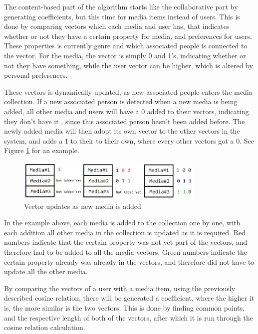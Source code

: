 The content-based part of the algorithm starts like the collaborative part by generating coefficients, but this time for media items instead of users. This is done by comparing vectors which each media and user has, that indicates whether or not they have a certain property for media, and preferences for users. These properties is currently genre and which associated people is connected to the vector. For the media, the vector is simply 0 and 1’s, indicating whether or not they have something, while the user vector can be higher, which is altered by personal preferences.

These vectors is dynamically updated, as new associated people enters the media collection. If a new associated person is detected when a new media is being added, all other media and users will have a 0 added to their vectors, indicating they don’t have it , since this associated person hasn’t been added before. The newly added media will then adopt its own vector to the other vectors in the system, and adds a 1 to their to their own, where every other vectors got a 0. See Figure \ref{VectorUpdate} for an example.

\begin{figure}[htb]
\centering
\includegraphics[width=0.8\textwidth]{Images/VectorUpdate.png}
\caption{Vector updates as new media is added}
\label{VectorUpdate}
\end{figure}

In the example above, each media is added to the collection one by one, with each addition all other media in the collection is updated as it is required. Red numbers indicate that the certain property was not yet part of the vectors, and therefore had to be added to all the media vectors. Green numbers indicate the certain property already was already in the vectors, and therefore did not have to update all the other media.

By comparing the vectors of a user with a media item, using the previously described cosine relation, there will be generated a coefficient, where the higher it is, the more similar is the two vectors. This is done by finding common points, and the respective length of both of the vectors, after which it is run through the cosine relation calculation.

